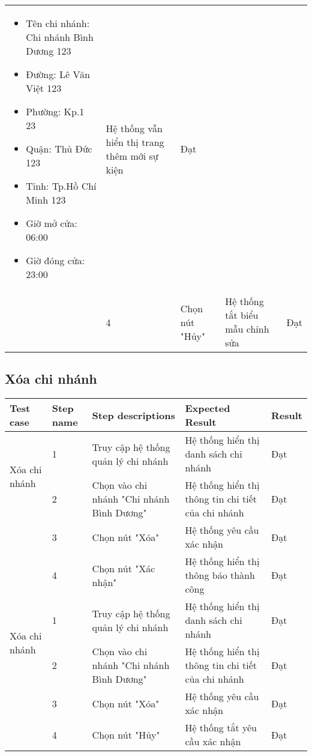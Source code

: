{\begin{longtable}{| p{2.5cm}| p{1cm}| p{5.5cm}| p{4.5cm} | p{1.5cm} |}
\begin{itemize}
            \item Tên chi nhánh: Chi nhánh Bình Dương 123
            \item Đường: Lê Văn Việt 123
            \item Phường: Kp.1 23
            \item Quận: Thủ Đức 123
            \item Tỉnh: Tp.Hồ Chí Minh 123
            \item Giờ mở cửa: 06:00
            \item Giờ đóng cửa: 23:00 
        \end{itemize} & Hệ thống vẫn hiển thị trang thêm mới sự kiện & Đạt \\
        \cline{2-5}
         & 4 & Chọn nút "Hủy" & Hệ thống tắt biểu mẫu chỉnh sửa & Đạt \\
        \hline
    \end{longtable} 
}

\subsection{Xóa chi nhánh}
{
    \setlength\extrarowheight{6pt}
    \begin{longtable}{| p{2.5cm}| p{1cm}| p{5.5cm}| p{4.5cm} | p{1.5cm} |}
        \hline
        \textbf{Test case} & \textbf{Step name} & \textbf{Step descriptions} & \textbf{Expected Result} & \textbf{Result} \\
        \hline
        \multirow[t]{2}{2.5cm}{Xóa chi nhánh} & 1 & Truy cập hệ thống quản lý chi nhánh & Hệ thống hiển thị danh sách chi nhánh & Đạt \\
        \cline{2-5}
         & 2 & Chọn vào chi nhánh "Chi nhánh Bình Dương" & Hệ thống hiển thị thông tin chi tiết của chi nhánh & Đạt \\
        \cline{2-5}
        & 3 & Chọn nút "Xóa" & Hệ thống yêu cầu xác nhận & Đạt \\
        \cline{2-5}
         & 4 & Chọn nút "Xác nhận" & Hệ thống hiển thị thông báo thành công & Đạt \\
        \hline
        \multirow[t]{2}{2.5cm}{Xóa chi nhánh} & 1 & Truy cập hệ thống quản lý chi nhánh & Hệ thống hiển thị danh sách chi nhánh & Đạt \\
        \cline{2-5}
         & 2 & Chọn vào chi nhánh "Chi nhánh Bình Dương" & Hệ thống hiển thị thông tin chi tiết của chi nhánh & Đạt \\
        \cline{2-5}
        & 3 & Chọn nút "Xóa" & Hệ thống yêu cầu xác nhận & Đạt \\
        \cline{2-5}
         & 4 & Chọn nút "Hủy" & Hệ thống tắt yêu cầu xác nhận & Đạt \\
        \hline
    \end{longtable} 
}


